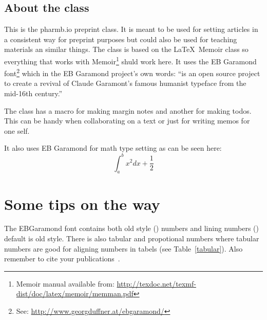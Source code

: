 \documentclass[pharmbio]{pbpreprint}
\begin{document}
\subsection{About the class}
This is the pharm\textcolor{uured}{b.io} preprint class. It is meant to be used
for setting articles in a consistent way for preprint purposes but could also
be used for teaching materials an similar things. The class is based on the
\LaTeX\ Memoir class so everything that works with Memoir\footnote{Memoir
manual available from:
\url{http://texdoc.net/texmf-dist/doc/latex/memoir/memman.pdf}} shuld work
here. It uses the EB Garamond font\footnote{See:
\url{http://www.georgduffner.at/ebgaramond/}} which in the EB Garamond
project's own words: ``is an open source project to create a revival of Claude
Garamont’s famous humanist typeface from the mid-16th century.''

The class has a macro for making margin notes and
another for making todos. This can be handy when
collaborating on a text or just for writing memos for one self.

It also uses EB Garamond for math type setting as can be seen here:
\begin{equation}
    \int_{a}^{b} x^2 dx + \frac{1}{2}
\end{equation}


\section{Some tips on the way}
The EBGaramond font contains both old style () numbers and lining numbers () default is old style. There is also tabular and propotional numbers where
tabular numbers are good for aligning numbers in tabels (see
Table~\ref{tabular}). Also remember to cite your
publications~\cite{spjuth2007bioclipse}.~\smiley{}
\end{document}
